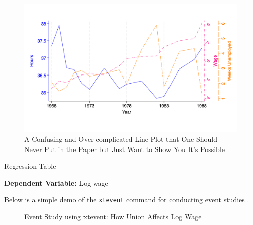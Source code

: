 \begin{figure}[H]
    \centering
    \caption{A Confusing and Over-complicated Line Plot that One Should Never Put in the Paper but Just Want to Show You It's Possible}
    \includegraphics[width=0.9\linewidth]{Output/Figures/line.png}
\end{figure}

\begin{table}[H]
    \caption{Regression Table}
    \caption*{\scriptsize\textbf{Dependent Variable:} Log wage }
    \centering
    \resizebox{0.6\textwidth}{!}{ %
    
    }
\end{table}

Below is a simple demo of the \verb|xtevent| command for conducting event studies \citep{carreto2024xtevent,freyaldenhoven2021visualization}. 

\begin{figure}[H]
    \caption{Event Study using xtevent: How Union Affects Log Wage}
    \begin{center}
    \end{center}
\end{figure}
